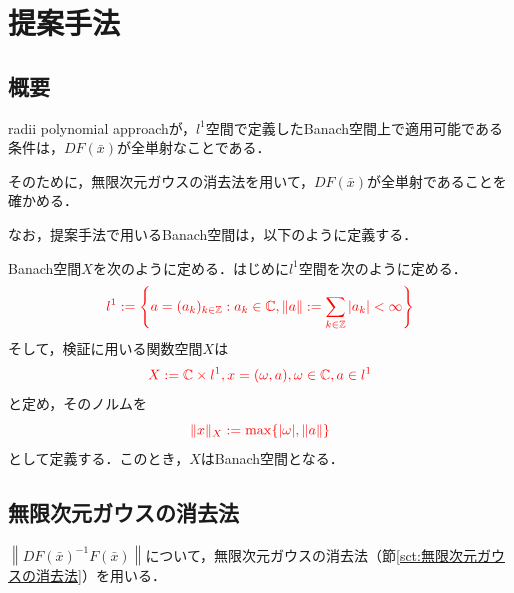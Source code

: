 \documentclass[11pt,a4paper,titlepage]{jsreport}
\theoremstyle{definition}
\newtheorem{dfn}{定義}
\newcommand{\rad}{radii polynomial approach}
\providecommand{\DIFdel}[1]{{\protect\color{red} \scriptsize #1}} %
\providecommand{\DIFdelbegin}{} %
\newcommand{\DIFscaledelfig}{0.5}
\newlength{\DIFdelgraphicswidth} %
\newlength{\DIFdelgraphicsheight} %
\newcommand{\DIFdelincludegraphics}[2][]{%
\sbox{\DIFdelgraphicsbox}{\DIFOincludegraphics[#1]{#2}}%
\settoboxwidth{\DIFdelgraphicswidth}{\DIFdelgraphicsbox} %
\settoboxtotalheight{\DIFdelgraphicsheight}{\DIFdelgraphicsbox} %
\scalebox{\DIFscaledelfig}{%
\parbox[b]{\DIFdelgraphicswidth}{\usebox{\DIFdelgraphicsbox}\\[-\baselineskip] \rule{\DIFdelgraphicswidth}{0em}}\llap{\resizebox{\DIFdelgraphicswidth}{\DIFdelgraphicsheight}{%
\setlength{\unitlength}{\DIFdelgraphicswidth}%
\begin{picture}(1,1)%
\thicklines\linethickness{2pt} %
{\color[rgb]{1,0,0}\put(0,0){\framebox(1,1){}}}%
{\color[rgb]{1,0,0}\put(0,0){\line( 1,1){1}}}%
{\color[rgb]{1,0,0}\put(0,1){\line(1,-1){1}}}%
\end{picture}%
}\hspace*{3pt}}} %
} %
\DeclareRobustCommand{\DIFdelbegin}{\DIFOdelbegin \let\includegraphics\DIFdelincludegraphics} %
\begin{document}
\chapter{提案手法}
\label{cpt:提案手法}

\section{概要}



\DIFdelbegin \DIFdel{\rad{}が，$l^1$空間で定義したBanach空間上で適用可能である条件は，$DF(\bar{x})$が全単射なことである．
}%

\DIFdel{そのために，無限次元ガウスの消去法を用いて，$DF(\bar{x})$が全単射であることを確かめる．
}%

\DIFdel{なお，提案手法で用いるBanach空間は，以下のように定義する．
}%

\DIFdel{Banach空間$X$を次のように定める．はじめに$l^1$空間を次のように定める．
  }\begin{displaymath}
    \DIFdel{l^1 := \left\{ a=(a_k)_{k\in \mathbb{Z}} : a_k \in \mathbb{C}, \|a\| := \sum_{k \in \mathbb{Z}} |a_k| < \infty \right\}
  }\end{displaymath}%
\DIFdel{そして，検証に用いる関数空間$X$は
  }\begin{displaymath}
    \DIFdel{X:= \mathbb{C} \times l^1, x = (\omega, a), \omega \in \mathbb{C}, a \in l^1
  }\end{displaymath}%
\DIFdel{と定め，そのノルムを
  }\begin{displaymath}
    \DIFdel{\| x \|_X := \max \{ |\omega| , \|a\| \}
  }\end{displaymath}%
\DIFdel{として定義する．このとき，$X$はBanach空間となる．
}%

\section{\DIFdel{無限次元ガウスの消去法}}
\addtocounter{section}{-1}%
\DIFdel{$\left \| DF(\bar{x})^{-1} F(\bar{x}) \right \|$について，無限次元ガウスの消去法（節\ref{sct:無限次元ガウスの消去法}）を用いる．
}%
\end{document}
